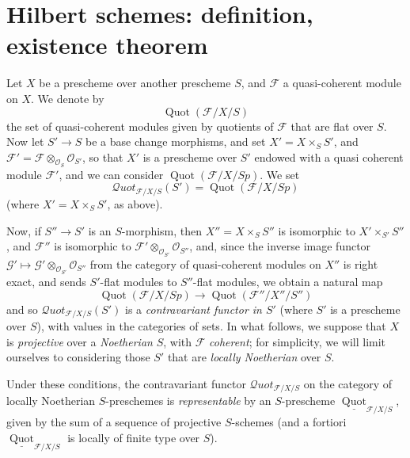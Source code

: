 \section{Hilbert schemes: definition, existence theorem}\label{fga3.iv-3}


Let $X$ be a prescheme over another prescheme $S$, and $\mathcal{F}$ a quasi-coherent module on $X$.
We denote by
\[
  \operatorname{Quot}(\mathcal{F}/X/S)
\]
the set of quasi-coherent modules given by quotients of $\mathcal{F}$ that are flat over $S$.
Now let $S'\to S$ be a base change morphisms, and set $X'=X\times_S S'$, and $\mathcal{F}'=\mathcal{F}\otimes_{\mathcal{O}_S}\mathcal{O}_{S'}$, so that $X'$ is a prescheme over $S'$ endowed with a quasi coherent module $\mathcal{F}'$, and we can consider $\operatorname{Quot}(\mathcal{F}/X/Sp)$.
We set
\[
  \mathcal{Q}uot_{\mathcal{F}/X/S} (S')
  = \operatorname{Quot}(\mathcal{F}/X/Sp)
\]
(where $X'=X\times_S S'$, as above).


Now, if $S''\to S'$ is an $S$-morphism, then $X''=X\times_S S''$ is isomorphic to $X'\times_{S'}S''$, and $\mathcal{F}''$ is isomorphic to $\mathcal{F}'\otimes_{\mathcal{O}_{S'}}\mathcal{O}_{S''}$, and, since the inverse image functor $\mathcal{G}'\mapsto\mathcal{G}'\otimes_{\mathcal{O}_{S'}}\mathcal{O}_{S''}$ from the category of quasi-coherent modules on $X''$ is right exact, and sends $S'$-flat modules to $S''$-flat modules, we obtain a natural map
\[
  \operatorname{Quot}(\mathcal{F}/X/Sp) \to \operatorname{Quot}(\mathcal{F}''/X''/S'')
\]
and so $\mathcal{Q}uot_{\mathcal{F}/X/S} (S')$ is a \emph{contravariant functor in $S'$} (where $S'$ is a prescheme over $S$), with values in the categories of sets.
In what follows, we suppose that $X$ is \emph{projective} over a \emph{Noetherian} $S$, with $\mathcal{F}$ \emph{coherent};
for simplicity, we will limit ourselves to considering those $S'$ that are \emph{locally Noetherian} over $S$.


\begin{theorem}\label{fga3.iv-3-theorem-3.1}
  Under these conditions, the contravariant functor $\mathcal{Q}uot_{\mathcal{F}/X/S}$ on the category of locally Noetherian $S$-preschemes is \emph{representable} by an $S$-prescheme $\underline{\operatorname{Quot}}_{\mathcal{F}/X/S}$, given by the sum of a sequence of projective $S$-schemes (and a fortiori $\underline{\operatorname{Quot}}_{\mathcal{F}/X/S}$ is locally of finite type over $S$).
\end{theorem}


